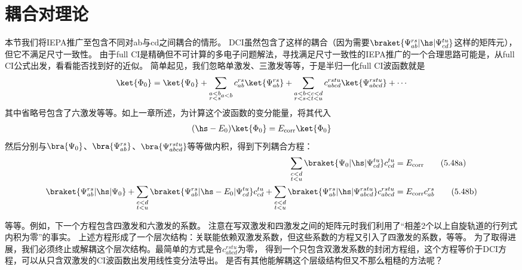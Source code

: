 \section{耦合对理论}
本节我们将IEPA推广至包含不同对ab与cd之间耦合的情形。
DCI虽然包含了这样的耦合（因为需要$\braket{\Psi^{rs}_{ab}|\hs|\Psi^{tu}_{cd}}$这样的矩阵元），但它不满足尺寸一致性。
由于full CI是精确但不可计算的多电子问题解法，寻找满足尺寸一致性的IEPA推广的一个合理思路可能是，从full CI公式出发，看看能否找到好的近似。
简单起见，我们忽略单激发、三激发等等，于是半归一化full CI波函数就是
\begin{align}
\ket{\Phi_0} = \ket{\Psi_0} + \sum_{\substack{a<b\\r<s}a<b}c_{ab}^{rs}\ket{\Psi_{ab}^{rs}}+\sum_{\substack{a<b<c<d\\r<s<t<u}}c_{abcd}^{rstu}\ket{\Psi_{abcd}^{rstu}}+\cdots
\end{align}
其中省略号包含了六激发等等。如上一章所述，为计算这个波函数的变分能量，将其代入
\begin{align}
(\hs-E_0)\ket{\Phi_0} = E_\text{corr}\ket{\Phi_0}
\end{align}
然后分别与$\bra{\Psi_0}$、$\bra{\Psi_{ab}^{rs}}$、$\bra{\Psi_{abcd}^{rstu}}$等等做内积，得到下列耦合方程：
\begin{align}
\sum_{\substack{c<d\\t<u}}\braket{\Psi_0|\hs|\Psi_{cd}^{tu}}c_{cd}^{tu}&=E_\text{corr}\tag{5.48a}\label{5.48a}\\
\braket{\Psi_{ab}^{rs}|\hs|\Psi_0}+\sum_{\substack{c<d\\t<u}}\braket{\Psi_{ab}^{rs}|\hs-E_0|\Psi_{cd}^{tu}}c_{cd}^{tu}
+\sum_{\substack{c<d\\t<u}}\braket{\Psi_{ab}^{rs}|\hs|\Psi_{abcd}^{rstu}}c^{rstu}_{abcd}&=E_\text{corr}c_{ab}^{rs}\tag{5.48b}\label{5.48b}
\end{align}
\addtocounter{equation}{1}
等等。例如，下一个方程包含四激发和六激发的系数。
注意在写双激发和四激发之间的矩阵元时我们利用了“相差2个以上自旋轨道的行列式内积为零”的事实。
上述方程形成了一个层次结构：关联能依赖双激发系数，但这些系数的方程又引入了四激发的系数，等等。
为了取得进展，我们必须终止或解耦这个层次结构。最简单的方式是令$c_{abcd}^{rstu}$为零，
得到一个只包含双激发系数的封闭方程组，这个方程等价于DCI方程，可以从只含双激发的CI波函数出发用线性变分法导出。
是否有其他能解耦这个层级结构但又不那么粗糙的方法呢？
